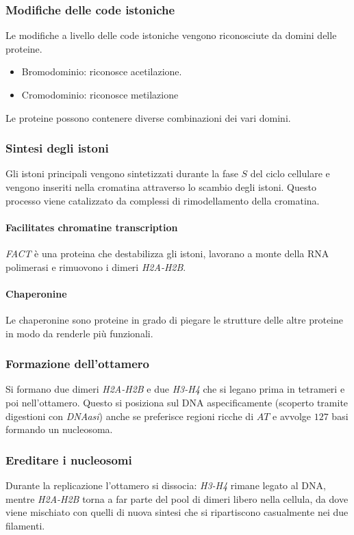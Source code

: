		\subsubsection{Modifiche delle code istoniche}
		Le modifiche a livello delle code istoniche vengono riconosciute da domini delle proteine.
		\begin{multicols}{2}
			\begin{itemize}
				\item Bromodominio: riconosce acetilazione.
				\item Cromodominio: riconosce metilazione
			\end{itemize}
		\end{multicols}
		Le proteine possono contenere diverse combinazioni dei vari domini.

		\subsubsection{Sintesi degli istoni}
		Gli istoni principali vengono sintetizzati durante la fase $S$ del ciclo cellulare e vengono inseriti nella cromatina attraverso lo scambio degli istoni.
		Questo processo viene catalizzato da complessi di rimodellamento della cromatina.

			\paragraph{Facilitates chromatine transcription}
			\emph{FACT} \`e una proteina che destabilizza gli istoni, lavorano a monte della RNA polimerasi e rimuovono i dimeri \emph{H2A-H2B}.

			\paragraph{Chaperonine}
			Le chaperonine sono proteine in grado di piegare le strutture delle altre proteine in modo da renderle pi\`u funzionali.

		\subsubsection{Formazione dell'ottamero}
		Si formano due dimeri \emph{H2A-H2B} e due \emph{H3-H4} che si legano prima in tetrameri e poi nell'ottamero.
		Questo si posiziona sul DNA aspecificamente (scoperto tramite digestioni con \emph{DNAasi}) anche se preferisce regioni ricche di $AT$ e avvolge $127$ basi formando un nucleosoma.

		\subsubsection{Ereditare i nucleosomi}
		Durante la replicazione l'ottamero si dissocia: \emph{H3-H4} rimane legato al DNA, mentre \emph{H2A-H2B} torna a far parte del pool di dimeri libero nella cellula, da dove viene mischiato
		con quelli di nuova sintesi che si ripartiscono casualmente nei due filamenti.

